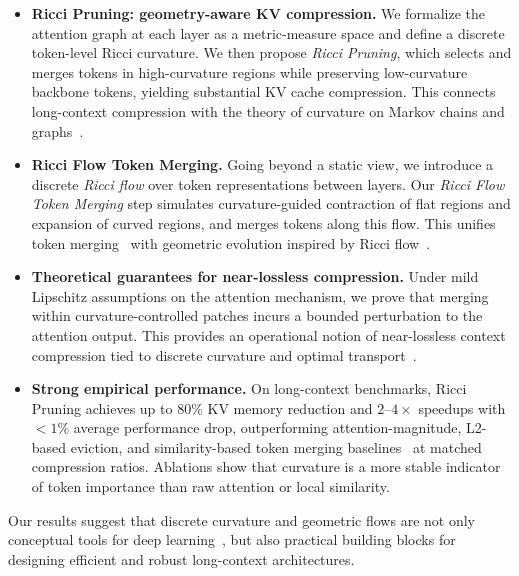 \documentclass{article}
\theoremstyle{plain}
\theoremstyle{definition}
\theoremstyle{remark}
\begin{document}
\begin{itemize}
    \item \textbf{Ricci Pruning: geometry-aware KV compression.} We formalize the attention graph at each layer as a metric-measure space and define a discrete token-level Ricci curvature. We then propose \emph{Ricci Pruning}, which selects and merges tokens in high-curvature regions while preserving low-curvature backbone tokens, yielding substantial KV cache compression. This connects long-context compression with the theory of curvature on Markov chains and graphs~\citep{ollivier2009ricci,forman2003bochner,lin2010ricci,ni2019community,yadav2025roadmap}.

    \item \textbf{Ricci Flow Token Merging.} Going beyond a static view, we introduce a discrete \emph{Ricci flow} over token representations between layers. Our \emph{Ricci Flow Token Merging} step simulates curvature-guided contraction of flat regions and expansion of curved regions, and merges tokens along this flow. This unifies token merging~\citep{bolya2023tome} with geometric evolution inspired by Ricci flow~\citep{morgan2007ricci,baptista2024deep}.

    \item \textbf{Theoretical guarantees for near-lossless compression.} Under mild Lipschitz assumptions on the attention mechanism, we prove that merging within curvature-controlled patches incurs a bounded perturbation to the attention output. This provides an operational notion of near-lossless context compression tied to discrete curvature and optimal transport~\citep{ollivier2009ricci,villani2009optimal}.

    \item \textbf{Strong empirical performance.} On long-context benchmarks, Ricci Pruning achieves up to $80\%$ KV memory reduction and $2$--$4\times$ speedups with $<1\%$ average performance drop, outperforming attention-magnitude, L2-based eviction, and similarity-based token merging baselines~\citep{ge2024fastgen,liu2024minicache,li2024snapkv,hooper2024kvquant,devoto2024l2kv,bolya2023tome} at matched compression ratios. Ablations show that curvature is a more stable indicator of token importance than raw attention or local similarity.
\end{itemize}

Our results suggest that discrete curvature and geometric flows are not only conceptual tools for deep learning~\citep{baptista2024deep}, but also practical building blocks for designing efficient and robust long-context architectures.
\end{document}
